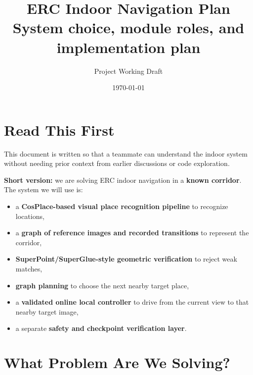 \documentclass[11pt,a4paper]{article}
\title{ERC Indoor Navigation Plan\\[0.3em]
\large System choice, module roles, and implementation plan}
\author{Project Working Draft}
\date{\today}
\begin{document}
\maketitle
\begin{center}
\end{center}
\vspace{1em}

\section{Read This First}

This document is written so that a teammate can understand the indoor system
without needing prior context from earlier discussions or code exploration.

\begin{mdframed}
\textbf{Short version:} we are solving ERC indoor navigation in a \textbf{known
corridor}. The system we will use is:

\begin{itemize}[nosep]
  \item a \textbf{CosPlace-based visual place recognition pipeline} to recognize locations,
  \item a \textbf{graph of reference images and recorded transitions} to represent the corridor,
  \item \textbf{SuperPoint/SuperGlue-style geometric verification} to reject weak matches,
  \item \textbf{graph planning} to choose the next nearby target place,
  \item a \textbf{validated online local controller} to drive from the current view to that nearby target image,
  \item a separate \textbf{safety and checkpoint verification layer}.
\end{itemize}
\end{mdframed}


\section{What Problem Are We Solving?}
\end{document}
